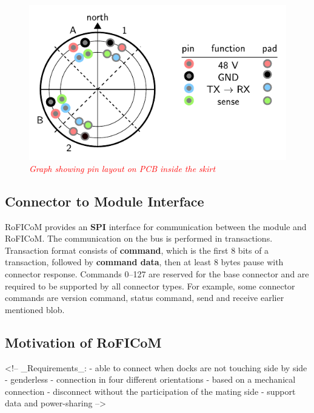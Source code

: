 \documentclass[
  digital,     %
  oneside,     %
  nosansbold,  %
  nocolorbold, %
  lof,         %
  lot,         %
]{fithesis4}
\newcommand{\TODO}[1]{\textcolor{red}{\textit{#1}}}
\begin{document}
\begin{figure}
    \includegraphics{ skirt_pins.pdf }
    \caption{ \TODO{Graph showing pin layout on PCB inside the skirt} }
\end{figure}

\subsection{ Connector to Module Interface }
RoFICoM provides an \textbf{SPI} interface for communication between the module and RoFICoM. The communication on the bus is performed
in transactions. Transaction format consists of \textbf{command}, which is the first 8 bits of a transaction, followed by \textbf{command
data}, then at least 8 bytes pause with connector response. Commands \numrange{0}{127} are reserved for the base connector and are required to be supported by all
connector types. For example, some connector commands are version command, status command, send and receive earlier
mentioned blob.

\iffalse
\subsection{ Motivation of RoFICoM }
<!--
_Requirements_:
- able to connect when docks are not touching side by side
- genderless
- connection in four different orientations
- based on a mechanical connection
- disconnect without the participation of the mating side
- support data and power-sharing
-->
\end{document}
